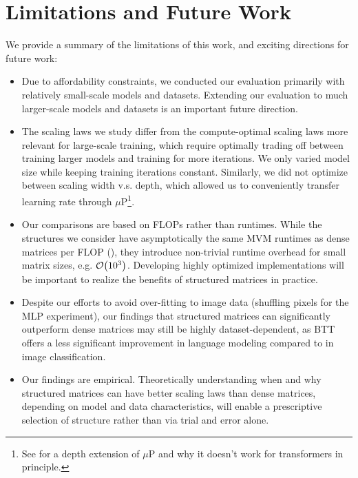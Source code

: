 \documentclass{article}
\theoremstyle{plain}
\theoremstyle{definition}
\theoremstyle{remark}
\newcommand{\mup}{$\mu$P\xspace}
\begin{document}
\section{Limitations and Future Work}
We provide a summary of the limitations of this work, and exciting directions for future work:
\begin{itemize}
\item Due to affordability constraints, we conducted our evaluation primarily with relatively small-scale models and datasets. Extending our evaluation to much larger-scale models and datasets is an important future direction.
\item The scaling laws we study differ from the compute-optimal scaling laws more relevant for large-scale training, which require optimally trading off between training larger models and training for more iterations. We only varied model size while keeping training iterations constant. Similarly, we did not optimize between scaling width v.s. depth, which allowed us to conveniently transfer learning rate through \mup\footnote{See \citet{yang2023tensor} for a depth extension of \mup and why it doesn't work for transformers in principle.}.
\item Our comparisons are based on FLOPs rather than runtimes. While the structures we consider have asymptotically the same MVM runtimes as dense matrices per FLOP (), they introduce non-trivial runtime overhead for small matrix sizes, e.g. $\order{10^3}$. Developing highly optimized implementations will be important to realize the benefits of structured matrices in practice.
\item Despite our efforts to avoid over-fitting to image data (shuffling pixels for the MLP experiment),  our findings that structured matrices can significantly outperform dense matrices may still be highly dataset-dependent, as BTT offers a less significant improvement in language modeling compared to in image classification.
\item Our findings are empirical. Theoretically understanding when and why structured matrices can have better scaling laws than dense matrices, depending on model and data characteristics, will enable a prescriptive selection of structure rather than via trial and error alone.
\end{itemize}
\end{document}
